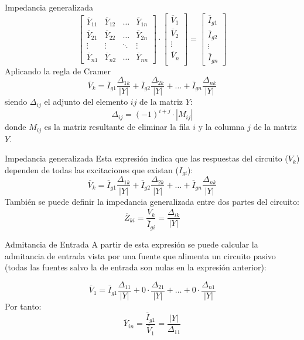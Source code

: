 \documentclass[aspectratio=169, usenames,svgnames,dvipsnames]{beamer}
\begin{document}
\begin{frame}[label={sec:orgf6505f9}]{Impedancia generalizada}
\begin{equation*}
  \begin{bmatrix}
    \overline{Y}_{11} & \overline{Y}_{12} & \dots & \overline{Y}_{1n} \\
    \overline{Y}_{21} & \overline{Y}_{22} & \dots & \overline{Y}_{2n} \\
    \vdots & \vdots & \ddots & \vdots \\
    \overline{Y}_{n1} & \overline{Y}_{n2} &  \dots & \overline{Y}_{nn}
  \end{bmatrix} \cdot %
  \begin{bmatrix}
    \overline{V}_1\\
    \overline{V}_2\\
    \vdots \\
    \overline{V}_n\\
  \end{bmatrix} = %
  \begin{bmatrix}
    \overline{I}_{g1}\\
    \overline{I}_{g2}\\
    \vdots \\
    \overline{I}_{gn}
  \end{bmatrix}
\end{equation*}
Aplicando la regla de Cramer
\[
  \overline{V}_k = \overline{I}_{g1} \frac{\Delta_{1k}}{|Y|} + \overline{I}_{g2} \frac{\Delta_{2k}}{|Y|} + \dots + \overline{I}_{gn} \frac{\Delta_{nk}}{|Y|}
\]
siendo \(\Delta_{ij}\) el adjunto del elemento \(ij\) de la matriz \(Y\):
\[
  \Delta_{ij} = (-1)^{i+j} \cdot |M_{ij}|
\]
donde \(M_{ij}\) es la matriz resultante de eliminar la fila \(i\) y la columna \(j\) de la matriz \(Y\).
\end{frame}

\begin{frame}[label={sec:orge2e8370}]{Impedancia generalizada}
Esta expresión indica que las respuestas del circuito (\(V_k\)) dependen de todas las excitaciones que existan (\(I_{gi}\)):
\[
  \overline{V}_k = \overline{I}_{g1} \frac{\Delta_{1k}}{|Y|} + \overline{I}_{g2} \frac{\Delta_{2k}}{|Y|} + \dots + \overline{I}_{gn} \frac{\Delta_{nk}}{|Y|}
\]
También se puede definir la impedancia generalizada entre dos partes del circuito:
\[
  \overline{Z}_{ki} = \frac{\overline{V}_k}{\overline{I}_{gi}} = \frac{\Delta_{ik}}{|Y|}
\]
\end{frame}

\begin{frame}[label={sec:orge6d9330}]{Admitancia de Entrada}
A partir de esta expresión se puede calcular la admitancia de entrada vista por una fuente que alimenta un circuito pasivo (todas las fuentes salvo la de entrada son nulas en la expresión anterior):

\[
  \overline{V}_1 = \overline{I}_{g1} \frac{\Delta_{11}}{|Y|} + 0 \cdot \frac{\Delta_{21}}{|Y|} + \dots + 0 \cdot \frac{\Delta_{n1}}{|Y|}
\]
Por tanto:
\[
  \boxed{\overline{Y}_{in} = \frac{\overline{I}_{g1}}{\overline{V}_1}=  \frac{|Y|}{\Delta_{11}}}
\]
\end{frame}
\end{document}
